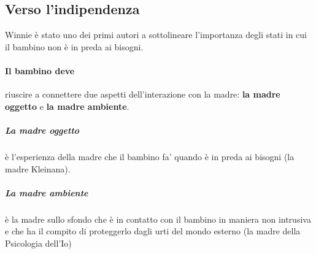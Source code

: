 \documentclass[12pt, a4paper]{article}
\begin{document}
\subsection{Verso l'indipendenza}

Winnie \`e stato uno dei primi autori a sottolineare l'importanza degli stati in cui il bambino non \`e in preda ai bisogni.

\paragraph{Il bambino deve} riuscire a connettere due aspetti dell'interazione con la madre: \textbf{la madre oggetto} e \textbf{la madre ambiente}. 

\subparagraph{La madre oggetto} \`e l'esperienza della madre che il bambino fa' quando \`e in preda ai bisogni (la madre Kleinana).  

    \subparagraph{La madre ambiente} \`e la madre sullo sfondo che \`e in contatto con il bambino in maniera non intrusiva e che ha il compito di proteggerlo dagli urti del mondo esterno (la madre della Psicologia dell'Io)
\end{document}

